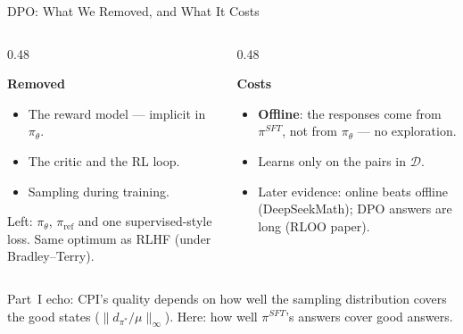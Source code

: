 \documentclass[aspectratio=169]{beamer}
\begin{document}
\begin{frame}{DPO: What We Removed, and What It Costs}
  \begin{columns}[t]
    \begin{column}{0.48\textwidth}
      \begin{goodbox}[equal height group=dpo]
        \small\raggedright\textbf{Removed}
        \begin{itemize}
          \item The reward model --- implicit in $\pi_\theta$.
          \item The critic and the RL loop.
          \item Sampling during training.
        \end{itemize}
        Left: $\pi_\theta$, $\pi_{\mathrm{ref}}$ and one supervised-style loss. Same optimum as RLHF (under Bradley--Terry).
      \end{goodbox}
    \end{column}
    \begin{column}{0.48\textwidth}
      \begin{badbox}[equal height group=dpo]
        \small\raggedright\textbf{Costs}
        \begin{itemize}
          \item \textbf{Offline}: the responses come from $\pi^{SFT}$, not from $\pi_\theta$ --- no exploration.
          \item Learns only on the pairs in $\mathcal D$.
          \item Later evidence: online beats offline (DeepSeekMath); DPO answers are long (RLOO paper).
        \end{itemize}
      \end{badbox}
    \end{column}
  \end{columns}
  \vspace{6pt}
  \begin{noteframe}
    \small Part~I echo: CPI's quality depends on how well the sampling distribution covers the good states ($\|d_{\pi^*}/\mu\|_\infty$). Here: how well $\pi^{SFT}$'s answers cover good answers.
  \end{noteframe}
\end{frame}
\end{document}
